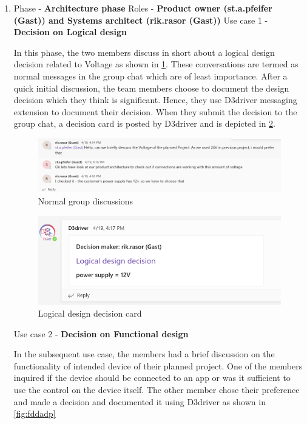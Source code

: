 \begin{enumerate}
\item Phase - \textbf{Architecture phase} \newline
Roles - \textbf{Product owner (st.a.pfeifer (Gast))  and Systems architect (rik.rasor (Gast))} \newline
Use case 1 - \textbf{Decision on Logical design} 

In this phase, the two members discuss in short about a logical design decision related to Voltage as shown in \ref{fig:discussionadp}. These conversations are termed as normal messages in the group chat which are of least importance. After a quick initial discussion, the team members choose to document the design decision which they think is significant. Hence, they use D3driver messaging extension to document their decision. When they submit the decision to the group chat, a decision card is posted by D3driver and is depicted in \ref{fig:lddbyd3d}.

\begin{figure}
\centering
\includegraphics[width=0.8\linewidth]{figures/discussionadp}
\caption{Normal group discussions}
\label{fig:discussionadp}
\end{figure}

\begin{figure}[h]
\centering
\includegraphics[width=0.7\linewidth]{figures/lddbyd3d}
\caption{Logical design decision card}
\label{fig:lddbyd3d}
\end{figure}

\newpage

Use case 2 - \textbf{Decision on Functional design}

In the subsequent use case, the members had a brief discussion on the functionality of intended device of their planned project. One of the members inquired if the device should be connected to an app or was it sufficient to use the control on the device itself. The other member chose their preference and made a decision and documented it using D3driver as shown in \ref{fig:fddadp}



\end{enumerate}
